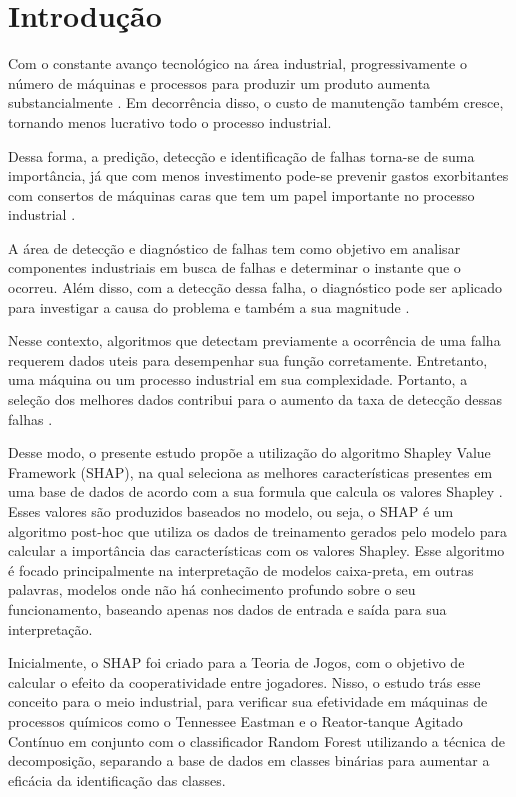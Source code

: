 \chapter{Introdução}
\label{sec-intro}

Com o constante avanço tecnológico na área industrial, progressivamente o número de máquinas e processos para produzir um produto aumenta substancialmente \cite{brynjolfsson2011race}. Em decorrência disso, o custo de manutenção também cresce, tornando menos lucrativo todo o processo industrial.

Dessa forma, a predição, detecção e identificação de falhas torna-se de suma importância, já que com menos investimento pode-se prevenir gastos exorbitantes com consertos de máquinas caras que tem um papel importante no processo industrial \cite{garcia2010time}.

A área de detecção e diagnóstico de falhas tem como objetivo em analisar componentes industriais em busca de falhas e determinar o instante que o ocorreu. Além disso, com a detecção dessa falha, o diagnóstico pode ser aplicado para investigar a causa do problema e também a sua magnitude \cite{reppa2011fault}.

Nesse contexto, algoritmos que detectam previamente a ocorrência de uma falha requerem dados uteis para desempenhar sua função corretamente. Entretanto, uma máquina ou um processo industrial em sua complexidade. Portanto, a seleção dos melhores dados contribui para o aumento da taxa de detecção dessas falhas \cite{karabulut2012comparative}.

Desse modo, o presente estudo propõe a utilização do algoritmo Shapley Value Framework (SHAP), na qual seleciona as melhores características presentes em uma base de dados de acordo com a sua formula que calcula os valores Shapley \cite{lundberg2017unified}. Esses valores são produzidos baseados no modelo, ou seja, o SHAP é um algoritmo post-hoc que utiliza os dados de treinamento gerados pelo modelo para calcular a importância das características com os valores Shapley. Esse algoritmo é focado principalmente na interpretação de modelos caixa-preta, em outras palavras, modelos onde não há conhecimento profundo sobre o seu funcionamento, baseando apenas nos dados de entrada e saída para sua interpretação.

Inicialmente, o SHAP foi criado para a Teoria de Jogos, com o objetivo de calcular o efeito da cooperatividade entre jogadores. Nisso, o estudo trás esse conceito para o meio industrial, para verificar sua efetividade em máquinas de processos químicos como o Tennessee Eastman e o Reator-tanque Agitado Contínuo em conjunto com o classificador Random Forest utilizando a técnica de decomposição, separando a base de dados em classes binárias para aumentar a eficácia da identificação das classes.

